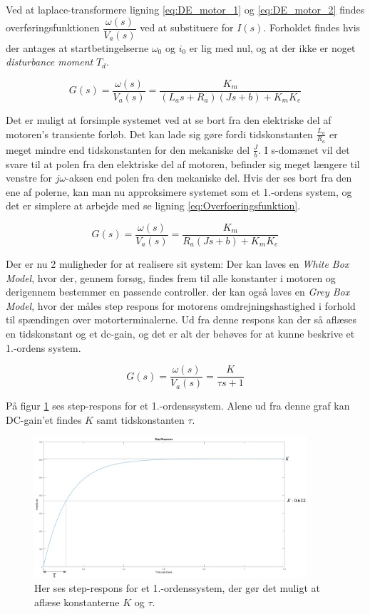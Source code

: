 Ved at laplace-transformere ligning \ref{eq:DE_motor_1} og \ref{eq:DE_motor_2} findes overføringsfunktionen $\dfrac{\omega(s)}{V_{a}(s)}$ ved at substituere for $I(s)$. Forholdet findes hvis der antages at startbetingelserne $\omega_{0}$ og $i_{0}$ er lig med nul, og at der ikke er noget \textit{disturbance moment} $T_{d}$.

\begin{equation}
G(s)=\dfrac{\omega(s)}{V_{a}(s)}=\dfrac{K_{m}}{(L_{a}s+R_{a})(Js+b)+K_{m}K_{e}}
\end{equation}

Det er muligt at forsimple systemet ved at se bort fra den elektriske del af motoren's transiente forløb. Det kan lade sig gøre fordi tidskonstanten $\frac{L_{a}}{R_{a}}$ er meget mindre end tidskonstanten for den mekaniske del $\frac{J}{b}$. I s-domænet vil det svare til at polen fra den elektriske del af motoren, befinder sig meget længere til venstre for $j\omega$-aksen end polen fra den mekaniske del. Hvis der ses bort fra den ene af polerne, kan man nu approksimere systemet som et 1.-ordens system, og det er simplere at arbejde med se ligning \ref{eq:Overfoeringsfunktion}.

\begin{equation} \label{eq:Overfoeringsfunktion}
G(s)=\dfrac{\omega(s)}{V_{a}(s)}=\dfrac{K_{m}}{R_{a}(Js+b)+K_{m}K_{e}}
\end{equation}

Der er nu 2 muligheder for at realisere sit system: Der kan laves en \textit{White Box Model}, hvor der, gennem forsøg, findes frem til alle konstanter i motoren og derigennem bestemmer en passende controller. der kan også laves en \textit{Grey Box Model}, hvor der måles step respons for motorens omdrejningshastighed i forhold til spændingen over motorterminalerne. Ud fra denne respons kan der så aflæses en tidskonstant og et dc-gain, og det er alt der behøves for at kunne beskrive et 1.-ordens system. 

\begin{equation}\label{eq:tf_pan_tilt}
G(s)=\dfrac{\omega(s)}{V_{a}(s)}=\dfrac{K}{\tau s+1}
\end{equation}

På figur \ref{fig:time_constant} ses step-respons for et 1.-ordenssystem. Alene ud fra denne graf kan DC-gain'et findes $K$ samt tidskonstanten $\tau$.

\begin{figure}[H]
			\begin{center}
			\includegraphics[width=0.9\textwidth]{Billeder/Time_Constant.PNG}
			\end{center}
			\caption{Her ses step-respons for et 1.-ordenssystem, der gør det muligt at aflæse konstanterne $K$ og $\tau$.}
			\label{fig:time_constant}
\end{figure}